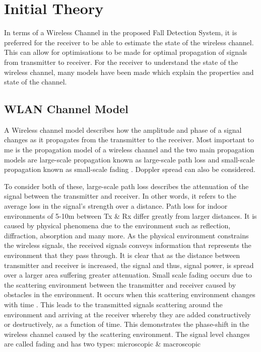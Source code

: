\section{Initial Theory}
In terms of a Wireless Channel in the proposed Fall Detection System, it is preferred for the receiver to be able to estimate the state of the wireless channel. This can allow for optimisations to be made for optimal propagation of signals from transmitter to receiver. For the receiver to understand the state of the wireless channel, many models have been made which explain the properties and state of the channel.
\subsection{WLAN Channel Model}
A Wireless channel model describes how the amplitude and phase of a signal changes as it propagates from the transmitter to the receiver. Most important to me is the propagation model of a wireless channel and the two main propagation models are large-scale propagation known as large-scale path loss and small-scale propagation known as small-scale fading \citep{articleWLAN}. Doppler spread can also be considered. \par
To consider both of these, large-scale path loss describes the attenuation of the signal between the transmitter and receiver. In other words, it refers to the average loss in the signal's strength over a distance. Path loss for indoor environments of 5-10m between Tx \& Rx differ greatly from larger distances. It is caused by physical phenomena due to the environment such as reflection, diffraction, absorption and many more. As the physical environment constrains the wireless signals, the received signals conveys information that represents the environment that they pass through. It is clear that as the distance between transmitter and receiver is increased, the signal and thus, signal power, is spread over a larger area suffering greater attenuation. Small scale fading occurs due to the scattering environment between the transmitter and receiver caused by obstacles in the environment. It occurs when this scattering environment changes with time \citep{articleWLAN}. This leads to the transmitted signals scattering around the environment and arriving at the receiver whereby they are added constructively or destructively, as a function of time. This demonstrates the phase-shift in the wireless channel caused by the scattering environment. The signal level changes are called fading and has two types: microscopic \& macroscopic \citep{channelModels}\par
